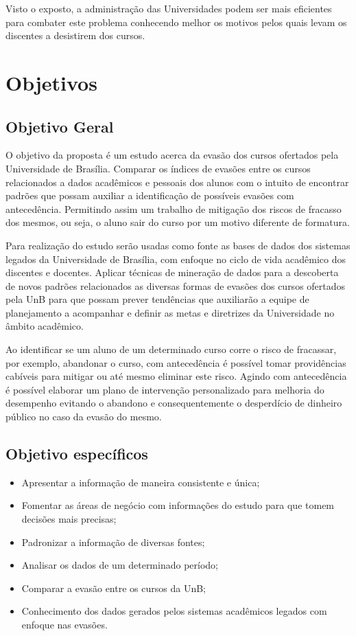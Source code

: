 Visto o exposto, a administração das Universidades podem ser mais eficientes para combater este problema conhecendo melhor os motivos pelos quais levam os discentes a desistirem dos cursos.  


\section{Objetivos}%

\subsection{Objetivo Geral}
O objetivo da proposta é um estudo acerca da evasão dos cursos ofertados pela Universidade de Brasília. Comparar os índices de evasões entre os cursos relacionados a dados acadêmicos e pessoais dos alunos com o intuito  de encontrar padrões que possam auxiliar a identificação de possíveis evasões com antecedência. Permitindo assim um trabalho de mitigação dos riscos de fracasso dos mesmos, ou seja, o aluno sair do curso por um motivo diferente de formatura.
 
Para realização do estudo serão usadas como fonte as bases de dados dos sistemas legados da Universidade de Brasília, com enfoque no ciclo de vida acadêmico dos discentes e docentes. Aplicar técnicas de mineração de dados para a descoberta de novos padrões relacionados as diversas formas de evasões dos cursos ofertados pela UnB para que possam prever tendências que  auxiliarão a equipe de planejamento a acompanhar e definir as metas e diretrizes da Universidade no âmbito acadêmico.

Ao identificar se um aluno de um determinado curso corre o risco de fracassar, por exemplo, abandonar o curso, com antecedência é possível tomar providências cabíveis para mitigar ou até mesmo eliminar este risco. Agindo com antecedência é possível elaborar um plano de intervenção personalizado para melhoria do desempenho evitando o abandono e consequentemente o desperdício de dinheiro público no caso da evasão do mesmo.

\subsection{Objetivo específicos}
\begin{enumerate} 
    \begin{itemize}
        \item	Apresentar a informação de maneira consistente e única;
        \item	Fomentar as áreas de negócio com informações do estudo para que tomem decisões mais precisas;
        \item	Padronizar a informação de diversas fontes;
        \item	Analisar os dados de um determinado período;
        \item   Comparar a evasão entre os cursos da UnB;
        \item   Conhecimento dos dados gerados pelos sistemas acadêmicos legados com enfoque nas evasões.
    \end{itemize}%
\end{enumerate}%
